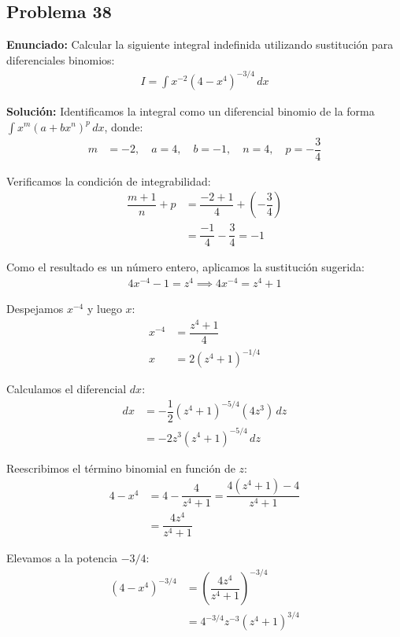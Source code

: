 \subsection*{Problema 38}

\textbf{Enunciado:}
Calcular la siguiente integral indefinida utilizando
sustitución para diferenciales binomios:
\begin{align*}
I = \int x^{-2} (4 - x^4)^{-3/4} \, dx
\end{align*}

\textbf{Solución:}
Identificamos la integral como un diferencial binomio
de la forma $\int x^m (a + bx^n)^p \, dx$, donde:
\begin{align*}
m &= -2, \quad a = 4, \quad b = -1, \quad n = 4, \quad p = -\dfrac{3}{4}
\end{align*}

Verificamos la condición de integrabilidad:
\begin{align*}
\dfrac{m + 1}{n} + p &= \dfrac{-2 + 1}{4} + \left(-\dfrac{3}{4}\right) \\
&= \dfrac{-1}{4} - \dfrac{3}{4} = -1
\end{align*}

Como el resultado es un número entero, aplicamos
la sustitución sugerida:
\begin{align*}
4x^{-4} - 1 = z^4 \implies 4x^{-4} = z^4 + 1
\end{align*}

Despejamos $x^{-4}$ y luego $x$:
\begin{align*}
x^{-4} &= \dfrac{z^4 + 1}{4} \\
x &= 2(z^4 + 1)^{-1/4}
\end{align*}

Calculamos el diferencial $dx$:
\begin{align*}
dx &= -\dfrac{1}{2}(z^4 + 1)^{-5/4}(4z^3) \, dz \\
&= -2z^3 (z^4 + 1)^{-5/4} \, dz
\end{align*}

Reescribimos el término binomial en función de $z$:
\begin{align*}
4 - x^4 &= 4 - \dfrac{4}{z^4 + 1} = \dfrac{4(z^4 + 1) - 4}{z^4 + 1} \\
&= \dfrac{4z^4}{z^4 + 1}
\end{align*}

Elevamos a la potencia $-3/4$:
\begin{align*}
(4 - x^4)^{-3/4} &= \left(\dfrac{4z^4}{z^4 + 1}\right)^{-3/4} \\
&= 4^{-3/4} z^{-3} (z^4 + 1)^{3/4}
\end{align*}


